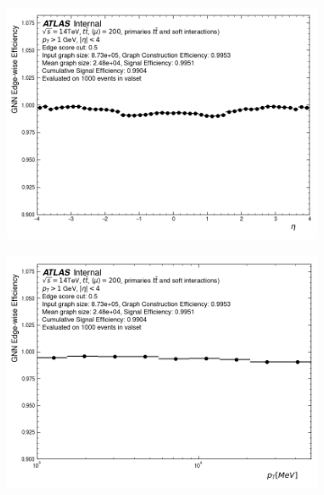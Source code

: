 \begin{figure}[h!]
\centering
\begin{subfigure}[b]{0.49\textwidth}
    \centering
    \includegraphics[width=\textwidth]{figures/gnn_MM_UNCLEANED_MEANRMS_WITHOUT_CONCAT_LATENT128_LN/edgewise_efficiency_eta.png}
    \caption{}
    \label{subfig:gnn-eff-eta-meanrms}
\end{subfigure}
\begin{subfigure}[b]{0.49\textwidth}
    \centering
    \includegraphics[width=\textwidth]{figures/gnn_MM_UNCLEANED_MEANRMS_WITHOUT_CONCAT_LATENT128_LN/edgewise_efficiency_pt.png}
    \caption{}
    \label{subfig:gnn-eff-pt-meanrms}
\end{subfigure}


\end{figure}
